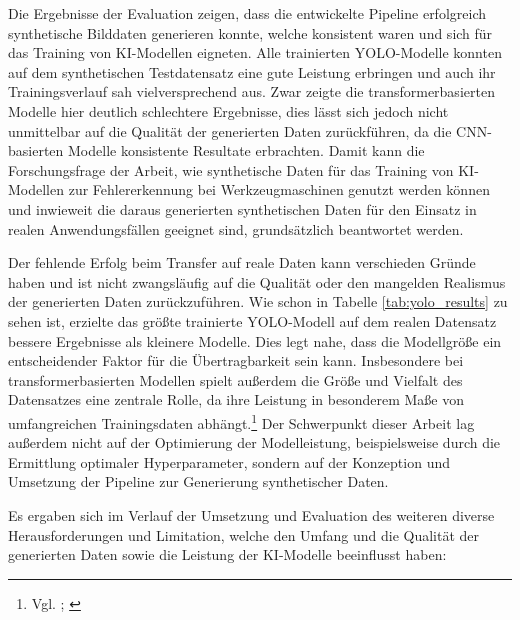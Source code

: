 Die Ergebnisse der Evaluation zeigen, dass die entwickelte Pipeline erfolgreich synthetische Bilddaten generieren konnte, welche konsistent waren und sich für das Training von \ac{KI}-Modellen eigneten. Alle trainierten \ac{YOLO}-Modelle konnten auf dem synthetischen Testdatensatz eine gute Leistung erbringen und auch ihr Trainingsverlauf sah vielversprechend aus. Zwar zeigte die transformerbasierten Modelle hier deutlich schlechtere Ergebnisse, dies lässt sich jedoch nicht unmittelbar auf die Qualität der generierten Daten zurückführen, da die CNN-basierten Modelle konsistente Resultate erbrachten. Damit kann die Forschungsfrage der Arbeit, wie synthetische Daten für das Training von \ac{KI}-Modellen zur Fehlererkennung bei Werkzeugmaschinen genutzt werden können und inwieweit die daraus generierten synthetischen Daten für den Einsatz in realen Anwendungsfällen geeignet sind, grundsätzlich beantwortet werden.

Der fehlende Erfolg beim Transfer auf reale Daten kann verschieden Gründe haben und ist nicht zwangsläufig auf die Qualität oder den mangelden Realismus der generierten Daten zurückzuführen. Wie schon in Tabelle \ref{tab:yolo_results} zu sehen ist, erzielte das größte trainierte \ac{YOLO}-Modell auf dem realen Datensatz bessere Ergebnisse als kleinere Modelle. Dies legt nahe, dass die Modellgröße ein entscheidender Faktor für die Übertragbarkeit sein kann. Insbesondere bei transformerbasierten Modellen spielt außerdem die Größe und Vielfalt des Datensatzes eine zentrale Rolle, da ihre Leistung in besonderem Maße von umfangreichen Trainingsdaten abhängt.\footnote{Vgl. \cite[8]{jamil_comprehensive_2022}; \cite[209]{berroukham_vision_2023}} Der Schwerpunkt dieser Arbeit lag außerdem nicht auf der Optimierung der Modelleistung, beispielsweise durch die Ermittlung optimaler Hyperparameter, sondern auf der Konzeption und Umsetzung der Pipeline zur Generierung synthetischer Daten.

Es ergaben sich im Verlauf der Umsetzung und Evaluation des weiteren diverse Herausforderungen und Limitation, welche den Umfang und die Qualität der generierten Daten sowie die Leistung der \ac{KI}-Modelle beeinflusst haben:

